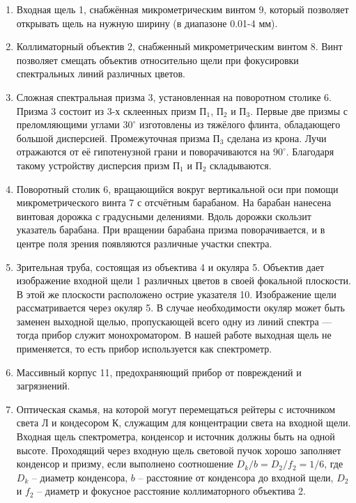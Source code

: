 \documentclass[a4paper, 12pt]{article}
\begin{document}
\begin{enumerate}
	\item Входная щель 1, снабжённая микрометрическим винтом 9, который позволяет открывать щель на нужную ширину (в диапазоне 0.01-4 мм).
	\item Коллиматорный объектив 2, снабженный микрометрическим винтом 8. Винт позволяет смещать объектив относительно щели при фокусировки спектральных линий различных цветов.
	\item Сложная спектральная призма 3, установленная на поворотном столике 6. Призма 3 состоит из 3-х склеенных призм $\text{П}_1$, $\text{П}_2$ и $\text{П}_3$. Первые две призмы с преломляющими углами $30^\circ$ изготовлены из тяжёлого флинта, обладающего большой дисперсией. Промежуточная призма $\text{П}_3$ сделана из крона. Лучи отражаются от её гипотенузной грани и поворачиваются на $90^\circ$. Благодаря такому устройству дисперсия призм $\text{П}_1$ и $\text{П}_2$ складываются.
	\item Поворотный столик 6, вращающийся вокруг вертикальной оси при помощи микрометрического винта 7 с отсчётным барабаном. На барабан нанесена винтовая дорожка с градусными делениями. Вдоль дорожки скользит указатель барабана. При вращении барабана призма поворачивается, и в центре поля зрения появляются различные участки спектра.
	\item Зрительная труба, состоящая из объектива 4 и окуляра 5. Объектив дает изображение входной щели 1 различных цветов в своей фокальной плоскости. В этой же плоскости расположено острие указателя 10. Изображение щели рассматривается через окуляр 5. В случае необходимости окуляр может быть заменен выходной щелью, пропускающей всего одну из линий спектра --- тогда прибор служит монохроматором. В нашей работе выходная щель не применяется, то есть прибор используется как спектрометр.
	\item Массивный корпус 11, предохраняющий прибор от повреждений и загрязнений.
	\item Оптическая скамья, на которой могут перемещаться рейтеры с источником света Л и кондесором К, служащим для концентрации света на входной щели. Входная щель спектрометра, конденсор и источник должны быть на одной высоте. Проходящий через входную щель световой пучок хорошо заполняет конденсор и призму, если выполнено соотношение $D_k/b=D_2/f_2=1/6$, где $D_k$ -- диаметр конденсора, $b$ -- расстояние от конденсора до входной щели, $D_2$ и $f_2$ -- диаметр и фокусное расстояние коллиматорного объектива 2.
\end{enumerate}
\end{document}
